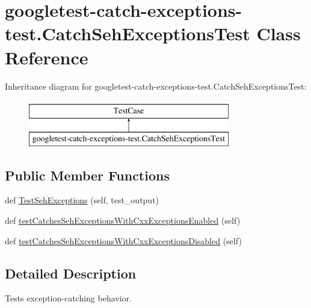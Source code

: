 \hypertarget{classgoogletest-catch-exceptions-test_1_1CatchSehExceptionsTest}{}\section{googletest-\/catch-\/exceptions-\/test.Catch\+Seh\+Exceptions\+Test Class Reference}
\label{classgoogletest-catch-exceptions-test_1_1CatchSehExceptionsTest}
Inheritance diagram for googletest-\/catch-\/exceptions-\/test.Catch\+Seh\+Exceptions\+Test\+:\begin{figure}[H]
\begin{center}
\leavevmode
\includegraphics[height=2.000000cm]{classgoogletest-catch-exceptions-test_1_1CatchSehExceptionsTest}
\end{center}
\end{figure}
\subsection*{Public Member Functions}
\begin{DoxyCompactItemize}
\item 
def \mbox{\hyperlink{classgoogletest-catch-exceptions-test_1_1CatchSehExceptionsTest_a86d5639a464b9ee5e05816758bd1ae1f}{Test\+Seh\+Exceptions}} (self, test\+\_\+output)
\item 
def \mbox{\hyperlink{classgoogletest-catch-exceptions-test_1_1CatchSehExceptionsTest_abfb6b8448b7af79621f6f663e40ebca3}{test\+Catches\+Seh\+Exceptions\+With\+Cxx\+Exceptions\+Enabled}} (self)
\item 
def \mbox{\hyperlink{classgoogletest-catch-exceptions-test_1_1CatchSehExceptionsTest_a8e448244058ea16b0ba3148678c0b9e6}{test\+Catches\+Seh\+Exceptions\+With\+Cxx\+Exceptions\+Disabled}} (self)
\end{DoxyCompactItemize}


\subsection{Detailed Description}
\begin{DoxyVerb}Tests exception-catching behavior.\end{DoxyVerb}
 

